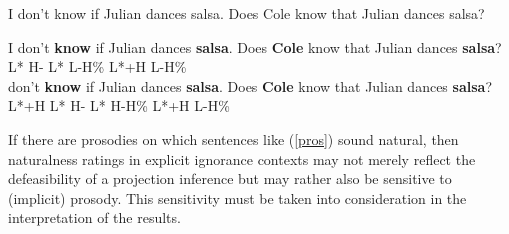 \documentclass[11pt,fleqn]{article}
\newcommand{\6}{\mbox{$[\hspace*{-.6mm}[$}}
\newcommand{\9}{\mbox{$]\hspace*{-.6mm}]$}}
\begin{document}
\begin{exe}
\ex\label{pros} I don't know if Julian dances salsa. Does Cole know that Julian dances salsa?
\begin{xlist}
\ex \gll I don't {\bf know} if Julian dances {\bf salsa}. Does {\bf Cole} know that Julian dances {\bf salsa}? 
\\ {} {} {L* H-} {} {} {} {L* L-H\%} {} L*+H {} {} {} {} {\hspace*{.2cm} L-H\%} \\ \glt 
\ex {} don't {\bf know} if Julian dances {\bf salsa}. Does {\bf Cole} know that Julian dances {\bf salsa}? 
\\ L*+H {} {L* H-} {} {} {} {L* H-H\%} {} L*+H {} {} {} {} {\hspace*{.2cm} L-H\%} \\ \glt 
\end{xlist}
\end{exe}
If there are prosodies on which sentences like (\ref{pros}) sound natural, then naturalness ratings in explicit ignorance contexts may not merely reflect the defeasibility of a projection inference but may rather also be sensitive to (implicit) prosody. This sensitivity must be taken into consideration in the interpretation of the results.


\end{document}
